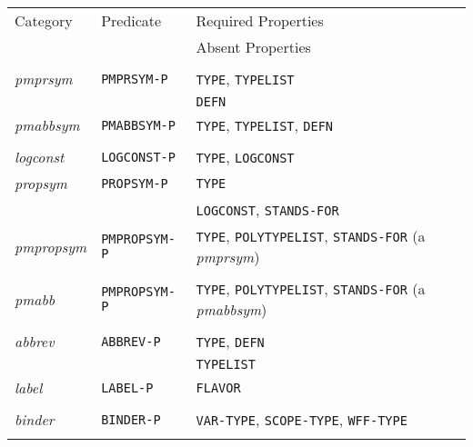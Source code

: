 \begin{tabular}{lll}
Category & Predicate & Required Properties \\
& & Absent Properties \\
\\
{\it pmprsym} & {\tt PMPRSYM-P} & {\tt TYPE}, {\tt TYPELIST} \\ & & {\tt DEFN} \\
{\it pmabbsym} & {\tt PMABBSYM-P} & {\tt TYPE}, {\tt TYPELIST}, {\tt DEFN} \\
 \\
{\it logconst} & {\tt LOGCONST-P} & {\tt TYPE}, {\tt LOGCONST} \\
{\it propsym} & {\tt PROPSYM-P} & {\tt TYPE} \\ & & {\tt LOGCONST}, {\tt STANDS-FOR} \\
{\it pmpropsym} & {\tt PMPROPSYM-P} & {\tt TYPE}, {\tt POLYTYPELIST}, {\tt STANDS-FOR}
(a {\it pmprsym}) \\ 
\\
{\it pmabb} & {\tt PMPROPSYM-P} & {\tt TYPE}, {\tt POLYTYPELIST}, {\tt STANDS-FOR}
(a {\it pmabbsym}) \\
\\
{\it abbrev} & {\tt ABBREV-P} & {\tt TYPE}, {\tt DEFN} \\ & & {\tt TYPELIST} \\
{\it label} & {\tt LABEL-P} & {\tt FLAVOR} \\
 \\
{\it binder} & {\tt BINDER-P} & {\tt VAR-TYPE}, {\tt SCOPE-TYPE}, {\tt WFF-TYPE} \\ \\
\end{tabular}

